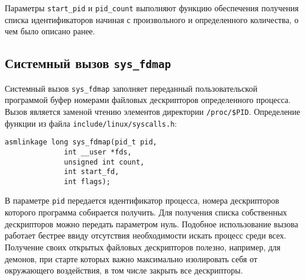 Параметры \texttt{start\_pid} и \texttt{pid\_count} выполняют функцию обеспечения
получения списка идентификаторов начиная с произвольного и определенного
количества, о чем было описано ранее.

\subsection{Системный вызов \texttt{sys\_fdmap}}

Системный вызов \texttt{sys\_fdmap} заполняет переданный пользовательской
программой буфер номерами файловых дескрипторов определенного процесса. Вызов
является заменой чтению элементов директории \texttt{/proc/\$PID}. Определение
функции из файла \texttt{include/linux/syscalls.h}:

\medskip
\begin{lstlisting}[style=cstyle]
asmlinkage long sys_fdmap(pid_t pid,
			  int __user *fds,
			  unsigned int count,
			  int start_fd,
			  int flags);
\end{lstlisting}
\medskip

В параметре \texttt{pid} передается идентификатор процесса, номера дескрипторов
которого программа собирается получить. Для получения списка собственных
дескрипторов можно передать параметром нуль. Подобное использование вызова
работает бестрее ввиду отсутствия необходимости искать процесс среди всех.
Получение своих открытых файловых дескрипторов полезно, например, для демонов,
при старте которых важно максимально изолировать себя от окружающего
воздействия, в том числе закрыть все дескрипторы.
